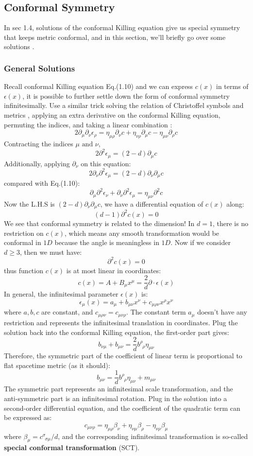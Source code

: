 \documentclass[12pt]{article}
\numberwithin{equation}{section}
\newcommand\<\langle
\renewcommand\>\rangle
\renewcommand\.{\cdot}
\begin{document}
\subsection*{Conformal Symmetry}
In sec 1.4, solutions of the conformal Killing equation give us special symmetry that keeps metric conformal, and in this section, we'll briefly go over some solutions \cite{DiFrancesco:1997nk}.
\subsubsection*{General Solutions}
Recall conformal Killing equation Eq.(1.10) and we can express $c(x)$ in terms of $\epsilon(x)$, it is possible to further settle down the form of conformal symmetry infinitesimally. Use a similar trick solving the relation of Christoffel symbols and metrics \cite{Carroll_2019}, applying an extra derivative on the conformal Killing equation, permuting the indices, and taking a linear combination \cite{DiFrancesco:1997nk}:
\[
    2\partial_{\mu}\partial_{\nu}\epsilon_{\rho} = \eta_{\mu\rho}\partial_{\nu}c+\eta_{\nu\rho}\partial_{\mu}c-\eta_{\mu\nu}\partial_{\rho}c
\]
Contracting the indices $\mu\text{ and }\nu$,
\[
    2\partial^2\epsilon_{\mu} = (2-d)\partial_{\mu}c
\]
Additionally, applying $\partial_{\nu}$ on this equation:
\[
    2\partial_{\nu}\partial^2\epsilon_{\mu} = (2-d)\partial_{\nu}\partial_{\mu}c
\]
compared with Eq.(1.10):
\[
    \partial_{\mu}\partial^2\epsilon_{\nu}+\partial_{\nu}\partial^2\epsilon_{\mu} = \eta_{\mu\nu}\partial^2c
\]
Now the L.H.S is $(2-d)\partial_{\nu}\partial_{\mu}c$, we have a differential equation of $c(x)$ along:
\[
    (d-1)\partial^2c(x) = 0
\]
We see that conformal symmetry is related to the dimension! In $d=1$, there is no restriction on $c(x)$, which means any smooth transformation would be conformal in $1D$ because the angle is meaningless in $1D$. Now if we consider $d\ge3$, then we must have:
\[
    \partial^2c(x) = 0
\]
thus function $c(x)$ is at most linear in coordinates:
\[
    c(x) = A + B_{\mu}x^{\mu} = \frac{2}{d}\partial\cdot\epsilon(x)
\]
In general, the infinitesimal parameter $\epsilon(x)$ is:
\[
    \epsilon_{\mu}(x) = a_{\mu} + b_{\mu\nu}x^{\nu}+c_{\mu\rho\nu}x^{\rho}x^{\nu}
\]
where $a,b,c$ are constant, and $c_{\mu\rho\nu} = c_{\mu\nu\rho}$. The constant term $a_{\mu}$ doesn't have any restriction and represents the infinitesimal translation in coordinates. Plug the solution back into the conformal Killing equation, the first-order part gives:
\[
    b_{\nu\mu}+b_{\mu\nu} = \frac{2}{d}b^{\rho}_{\,\,\,\rho}\eta_{\mu\nu}
\]
Therefore, the symmetric part of the coefficient of linear term is proportional to flat spacetime metric (as it should):
\[
    b_{\mu\nu} = \frac{1}{d}b^{\rho}_{\,\,\,\rho}\eta_{\mu\nu} + m_{\mu\nu}
\]
The symmetric part represents an infinitesimal scale transformation, and the anti-symmetric part is an infinitesimal rotation. Plug in the solution into a second-order differential equation, and the coefficient of the quadratic term can be expressed as:
\[
    c_{\mu\nu\rho} = \eta_{\mu\rho}\beta_{\nu}+\eta_{\nu\mu}\beta_{\rho}-\eta_{\nu\rho}\beta_{\mu}
\]
where $\beta_{\mu} = c^{\sigma}_{\,\,\,\sigma\mu}/d$, and the corresponding infinitesimal transformation is so-called \textbf{special conformal transformation} (SCT).
\end{document}
